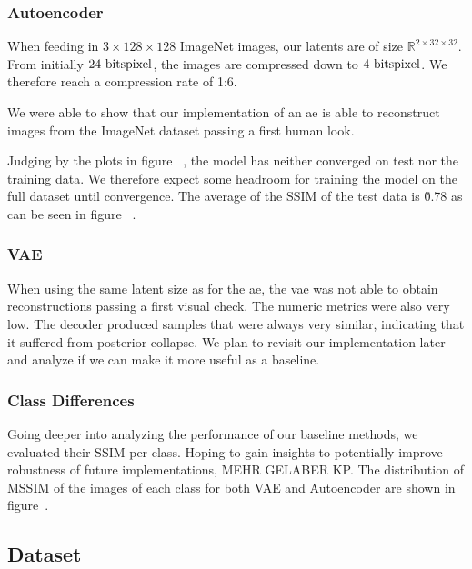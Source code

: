 \subsubsection{Autoencoder}\label{subsubsec:autoencoder}
When feeding in $3 \times 128 \times 128$ ImageNet images, our latents are of size $\mathbb{R}^{2\times 32 \times 32}$.
From initially $24\text{ bits}\/\text{pixel}$, the images are compressed down to $4\text{ bits}\/\text{pixel}$.
We therefore reach a compression rate of 1:6.

We were able to show that our implementation of an \ac{ae} is able to reconstruct images from the ImageNet dataset
passing a first human look.

Judging by the plots in figure ~\cite{citationNeeded}, the model has neither converged on test nor the training data.
We therefore expect some headroom for training the model on the full dataset until convergence.
The average of the SSIM of the test data is \~0.78 as can be seen in figure ~\cite{citationNeeded}.

\subsubsection{VAE}\label{subsubsec:vae_training}
When using the same latent size as for the \ac{ae}, the \ac{vae} was not able to obtain reconstructions
passing a first visual check.
The numeric metrics were also very low.
The decoder produced samples that were always very similar, indicating that it suffered from posterior collapse.
We plan to revisit our implementation later and analyze if we can make it more useful as a baseline.

\subsubsection{Class Differences}\label{subsubsec:class-differences}
Going deeper into analyzing the performance of our baseline methods, we evaluated their SSIM per class.
Hoping to gain insights to potentially improve robustness of future implementations, MEHR GELABER KP.
The distribution of MSSIM of the images of each class for both VAE and Autoencoder are shown in figure~\cite{citationNeeded}.



\subsection{Dataset}\label{subsec:dataset}

